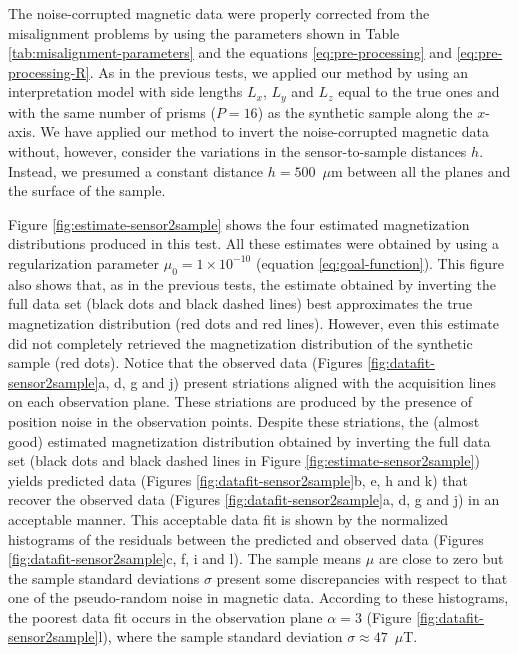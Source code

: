 \documentclass[draft,gc]{agutex}
\begin{document}
\begin{article}
The noise-corrupted magnetic data were properly corrected 
from the misalignment problems by using the parameters shown in 
Table \ref{tab:misalignment-parameters} and the equations 
\ref{eq:pre-processing} and \ref{eq:pre-processing-R}.
As in the previous tests, we applied our method by using
an interpretation model with side lengths $L_{x}$, $L_{y}$ 
and $L_{z}$ equal to the true ones and with the same number 
of prisms ($P = 16$) as the synthetic sample along the $x$-axis.
We have applied our method to invert the noise-corrupted magnetic 
data without, however, consider the variations in the 
sensor-to-sample distances $h$. Instead, we presumed a constant
distance $h = 500$~$\mu$m between all the planes and the surface
of the sample.

Figure \ref{fig:estimate-sensor2sample} shows the four
estimated magnetization distributions produced in this
test. All these estimates were obtained by using a regularization
parameter $\mu_{0} = 1 \times 10^{-10}$ (equation \ref{eq:goal-function}).
This figure also shows that,
as in the previous tests, the estimate obtained by 
inverting the full data set (black dots and black dashed lines) 
best approximates the true magnetization distribution
(red dots and red lines). However, even this estimate
did not completely retrieved the magnetization distribution of the synthetic
sample (red dots).
Notice that the observed data (Figures \ref{fig:datafit-sensor2sample}a, 
d, g and j) present striations aligned with the acquisition lines
on each observation plane. These striations are produced by the
presence of position noise in the observation points.
Despite these striations, the (almost good) estimated magnetization 
distribution obtained by inverting the full data set 
(black dots and black dashed lines in Figure \ref{fig:estimate-sensor2sample}) 
yields predicted data (Figures \ref{fig:datafit-sensor2sample}b, e, h and k) 
that recover the observed data (Figures \ref{fig:datafit-sensor2sample}a, 
d, g and j) in an acceptable manner.
This acceptable data fit is shown by the normalized histograms of 
the residuals between the predicted and
observed data (Figures \ref{fig:datafit-sensor2sample}c, f, i and l).
The sample means $\mu$ are close to zero but the sample standard 
deviations $\sigma$ present some discrepancies with respect to
that one of the pseudo-random noise in magnetic data.
According to these histograms, the poorest data fit occurs in the 
observation plane $\alpha = 3$ (Figure \ref{fig:datafit-sensor2sample}l),
where the sample standard deviation $\sigma \approx 47$~$\mu$T.


\end{article}
\end{document}
